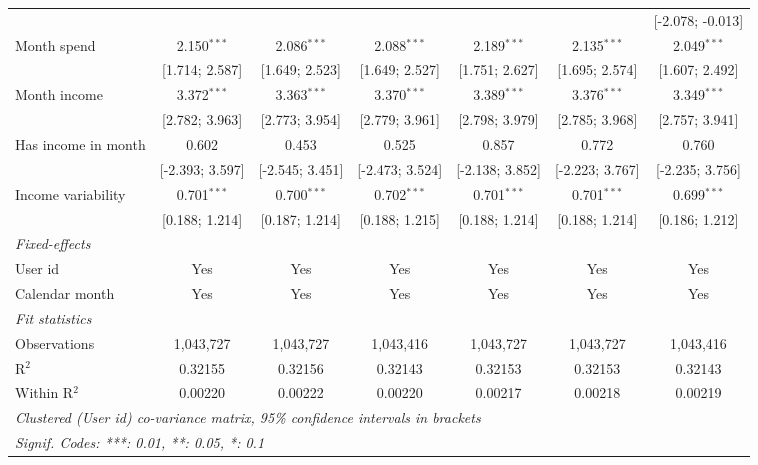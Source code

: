 \begin{table}[htbp]
\begin{threeparttable}[b]
\begin{tabular}{lcccccc}
                                    &                 &                 &                 &                 &                 & [-2.078; -0.013]\\   
         Month spend                & 2.150$^{***}$   & 2.086$^{***}$   & 2.088$^{***}$   & 2.189$^{***}$   & 2.135$^{***}$   & 2.049$^{***}$\\   
                                    & [1.714; 2.587]  & [1.649; 2.523]  & [1.649; 2.527]  & [1.751; 2.627]  & [1.695; 2.574]  & [1.607; 2.492]\\   
         Month income               & 3.372$^{***}$   & 3.363$^{***}$   & 3.370$^{***}$   & 3.389$^{***}$   & 3.376$^{***}$   & 3.349$^{***}$\\   
                                    & [2.782; 3.963]  & [2.773; 3.954]  & [2.779; 3.961]  & [2.798; 3.979]  & [2.785; 3.968]  & [2.757; 3.941]\\   
         Has income in month        & 0.602           & 0.453           & 0.525           & 0.857           & 0.772           & 0.760\\   
                                    & [-2.393; 3.597] & [-2.545; 3.451] & [-2.473; 3.524] & [-2.138; 3.852] & [-2.223; 3.767] & [-2.235; 3.756]\\   
         Income variability         & 0.701$^{***}$   & 0.700$^{***}$   & 0.702$^{***}$   & 0.701$^{***}$   & 0.701$^{***}$   & 0.699$^{***}$\\   
                                    & [0.188; 1.214]  & [0.187; 1.214]  & [0.188; 1.215]  & [0.188; 1.214]  & [0.188; 1.214]  & [0.186; 1.212]\\   
         \midrule
         \emph{Fixed-effects}\\
         User id                    & Yes             & Yes             & Yes             & Yes             & Yes             & Yes\\  
         Calendar month             & Yes             & Yes             & Yes             & Yes             & Yes             & Yes\\  
         \midrule
         \emph{Fit statistics}\\
         Observations               & 1,043,727       & 1,043,727       & 1,043,416       & 1,043,727       & 1,043,727       & 1,043,416\\  
         R$^2$                      & 0.32155         & 0.32156         & 0.32143         & 0.32153         & 0.32153         & 0.32143\\  
         Within R$^2$               & 0.00220         & 0.00222         & 0.00220         & 0.00217         & 0.00218         & 0.00219\\  
         \midrule \midrule
         \multicolumn{7}{l}{\emph{Clustered (User id) co-variance matrix, 95\% confidence intervals in brackets}}\\
         \multicolumn{7}{l}{\emph{Signif. Codes: ***: 0.01, **: 0.05, *: 0.1}}\\
      \end{tabular}
   \end{threeparttable}
\end{table}



